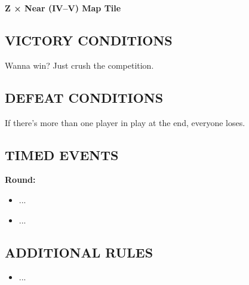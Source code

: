 \begin{multicols*}{2}
\textbf{Z × Near (IV--V) Map Tile}

\subsection*{\MakeUppercase{Victory Conditions}}
Wanna win? Just crush the competition.

\subsection*{\MakeUppercase{Defeat Conditions}}
If there's more than one player in play at the end, everyone loses.

\subsection*{\MakeUppercase{Timed Events}}

\textbf{ Round:}
\begin{itemize}
  \item ...
  \item ...
\end{itemize}

%
%
%

\subsection*{\MakeUppercase{Additional Rules}}

\begin{itemize}
    \item ...
\end{itemize}

\end{multicols*}

